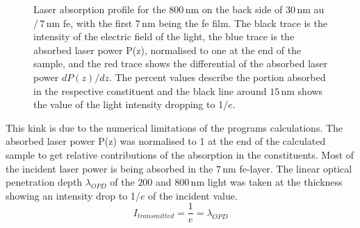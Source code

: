 \documentclass[a4paper,12pt,twoside]{article}
\begin{document}
	\begin{figure}[H]
		\caption{Laser absorption profile for the $800\,\mathrm{nm}$ on the back side of $30\,\mathrm{\mbox{nm}}$ \gls{au} /\,$7\,\mathrm{\mbox{nm}}$ \gls{fe}, with the first $7\,\mathrm{nm}$ being the \gls{fe} film. The black trace is the intensity of the electric field of the light, the blue trace is the absorbed laser power P(z), normalised to one at the end of the sample, and the red trace shows the differential of the absorbed laser power $dP(z)/dz$. The percent values describe the portion absorbed in the respective constituent and the black line around $15\,\mathrm{nm}$ shows the value of the light intensity dropping to 1/$e$.}
		    \label{30nmbplaser}
	\end{figure}
	\noindent This kink is due to the numerical limitations of the programs calculations. The absorbed laser power P(z) was normalised to 1 at the end of the calculated sample to get relative contributions of the absorption in the constituents. Most of the incident laser power is being absorbed in the $7\,\mathrm{nm}$ \gls{fe}-layer. The linear optical penetration depth $\lambda_{OPD}$ of the $200$ and $800\,\mathrm{nm}$ light was taken at the thickness showing an intensity drop to 1/$e$ of the incident value.
    \begin{equation}
        \label{opd}
        I_{ transmitted } = \frac{ 1 }{ e } = \lambda_{OPD}
    \end{equation}
    \\
\end{document}
